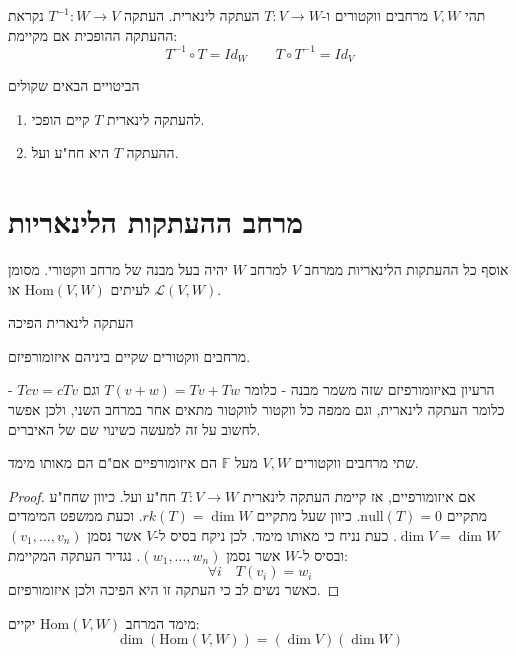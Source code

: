 \documentclass{tstextbook}
\begin{document}
\begin{definition}
תהי \(V, W\)  מרחבים ווקטורים ו-\(T:V\to W\) העתקה לינארית. העתקה \(T^{-1}:W\to V\) נקראת ההעתקה ההופכית אם מקיימת:
$$T^{-1}\circ  T=Id_{W}\qquad T\circ T^{-1}=Id_{V}$$

\end{definition}
\begin{proposition}
הביטויים הבאים שקולים

  \begin{enumerate}
    \item להעתקה לינארית \(T\) קיים הופכי. 


    \item ההעתקה \(T\) היא חח"ע ועל. 


  \end{enumerate}
\end{proposition}
\section{מרחב ההעתקות הלינאריות}

\begin{proposition}
אוסף כל ההעתקות הלינאריות ממרחב \(V\) למרחב \(W\) יהיה בעל מבנה של מרחב ווקטורי. מסומן לעיתים \(\mathrm{Hom}(V,W)\) או \(\mathcal{L}(V,W)\).

\end{proposition}
\begin{definition}[איזומורפיזם]
העתקה לינארית הפיכה

\end{definition}
\begin{definition}
מרחבים ווקטורים שקיים ביניהם איזומורפיזם.

\end{definition}
\begin{remark}
הרעיון באיזומורפיזם שזה משמר מבנה - כלומר \(T(v+w)=Tv+Tw\) וגם \(Tcv=cTv\) - כלומר העתקה לינארית, וגם ממפה כל ווקטור לווקטור מתאים אחר במרחב השני, ולכן אפשר לחשוב על זה למעשה כשינוי שם של האיברים.

\end{remark}
\begin{proposition}
שתי מרחבים ווקטורים \(V,W\) מעל \(\mathbb{F}\) הם איזומורפיים אם"ם הם מאותו מימד.

\end{proposition}
\begin{proof}
אם איזומורפיים, אז קיימת העתקה לינארית \(T:V\to W\) חח"ע ועל. כיוון שחח"ע מתקיים \(\text{null}(T)=0\). כיוון שעל מתקיים \(rk(T)=\dim W\). וכעת ממשפט המימדים \(\dim V=\dim W\).
כעת נניח כי מאותו מימד. לכן ניקח בסיס ל-\(V\) אשר נסמן \(\left( v_{1},\dots,v_{n} \right)\) ובסיס ל-\(W\) אשר נסמן \(\left( w_{1},\dots,w_{n} \right)\). נגדיר העתקה המקיימת:
$$\forall i\quad T(v_{i})=w_{i}$$
כאשר נשים לב כי העתקה זו היא הפיכה ולכן איזומורפיזם.

\end{proof}
\begin{proposition}
מימד המרחב \(\mathrm{Hom}(V,W)\) יקיים:
$$\dim \left( \mathrm{Hom}(V,W) \right)=\left( \dim V \right)\left( \dim  W \right)$$

\end{proposition}
\end{document}
